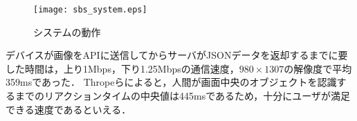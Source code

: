   \begin{figure}[tb]
    \centerline{\texttt{[image: sbs\_system.eps]}}
    \caption{システムの動作}
    \label{figure:sbs_system}
  \end{figure}

  デバイスが画像をAPIに送信してからサーバがJSONデータを返却するまでに要した時間は，上り1Mbps，下り1.25Mbpsの通信速度，$980 \times 1307$の解像度で平均359msであった．
  Thropeらによると，人間が画面中央のオブジェクトを認識するまでのリアクションタイムの中央値は445msであるため\cite{Thorpe:1996}，十分にユーザが満足できる速度であるといえる．
